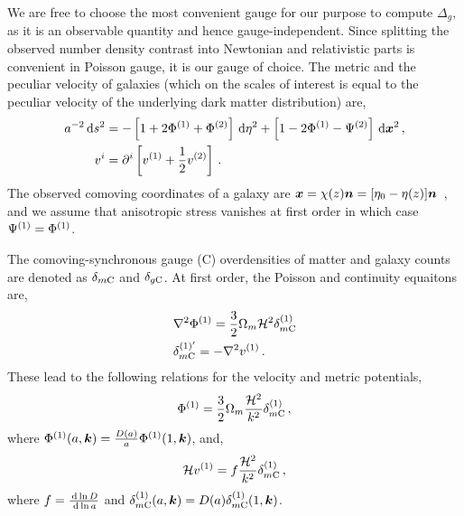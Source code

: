We are free to choose the most convenient gauge for our purpose to compute $\Delta_g$, as it is an observable quantity and hence gauge-independent. Since splitting the observed number density contrast into Newtonian and relativistic parts is convenient in Poisson gauge, it is our gauge of choice. The metric and the peculiar velocity of galaxies (which on the scales of interest is equal to the peculiar velocity of the underlying dark matter distribution) are, 
\begin{align}
	a^{-2} \,\mathrm{d} s^2 &= - \left[ 1 + 2 \Phi^{(1)} + \Phi^{(2)} \right] \,\mathrm{d} \eta^2 + \left[ 1 - 2 \Phi^{(1)} - \Psi^{(2)} \right] \,\mathrm{d}\bm {x}^2\,,\\
	v^i &= \partial^i \left[ v^{(1)} + \frac{1}{2} v^{(2)} \right]\,.
\end{align}
The observed comoving coordinates of a galaxy are $\bm {x} = \chi(z) \bm {n} = [\eta_0 - \eta(z)] \bm {n}$~\cite{Bertacca:2014dra}, and we assume that anisotropic stress vanishes at first order in which case $\Psi^{(1)} = \Phi^{(1)}$.

The comoving-synchronous gauge (C) overdensities of matter and galaxy counts are denoted as $\delta_{m\mathrm{C}}$ and $\delta_{g\mathrm{C}}$. At first order, the Poisson and continuity equaitons are,
\begin{align}
	&\nabla^2 \Phi^{(1)} = \frac{3}{2} \Omega_m \mathcal{H}^2 \delta_{m\mathrm{C}}^{(1)} \\
	&\delta_{m\mathrm{C}}^{{(1)}'} = - \nabla^2 v^{(1)}\,.
\end{align}
These lead to the following relations for the velocity and metric potentials,
\begin{equation}
	\Phi^{(1)} = \frac{3}{2} \Omega_m \frac{\mathcal{H}^2}{k^2} \delta_{m\mathrm{C}}^{(1)}\,,
\end{equation}
where $\Phi^{(1)}(a,\bm {k}) = \frac{D(a)}{a} \Phi^{(1)}(1,\bm {k})$, and,
\begin{equation}\label{eq:scdepvel}
	\mathcal{H} v^{(1)} = f \frac{\mathcal{H}^2}{k^2} \delta^{(1)}_{m\mathrm{C}}\,,
\end{equation}
where $f = \frac{\,\mathrm{d} \ln D}{\,\mathrm{d} \ln a}$ and $\delta^{(1)}_{m\mathrm{C}}(a,\bm {k}) = D(a) \delta^{(1)}_{m\mathrm{C}}(1,\bm {k})$. 


